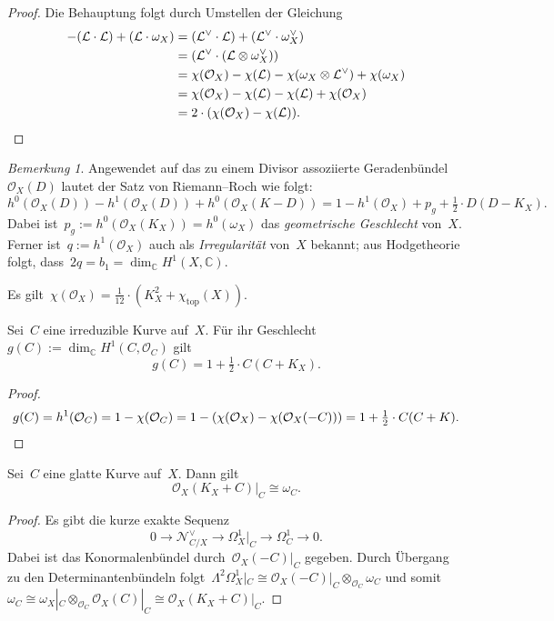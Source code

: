 \documentclass[a4paper,ngerman,12pt]{scrartcl}
\theoremstyle{definition}
\theoremstyle{plain}
\theoremstyle{remark}
\newtheorem{rem}[defn]{Bemerkung}
\newcommand{\CC}{\mathbb{C}}
\newcommand{\N}{\mathcal{N}}
\renewcommand{\L}{\mathcal{L}}
\renewcommand{\O}{\mathcal{O}}
\newcommand{\lra}{\longrightarrow}
\begin{document}
\begin{proof}Die Behauptung folgt durch Umstellen der Gleichung
\begin{align*}
  -(\L \cdot \L) + (\L \cdot \omega_X)
  &= (\L^\vee \cdot \L) + (\L^\vee \cdot \omega_X^\vee) \\
  &= (\L^\vee \cdot (\L \otimes \omega_X^\vee)) \\
  &= \chi(\O_X) - \chi(\L) - \chi(\omega_X \otimes \L^\vee) + \chi(\omega_X) \\
  &= \chi(\O_X) - \chi(\L) - \chi(\L) + \chi(\O_X) \\
  &= 2 \cdot (\chi(\O_X) - \chi(\L)). \qedhere
\end{align*}
\end{proof}

\begin{rem}Angewendet auf das zu einem Divisor assoziierte
Geradenbündel~$\O_X(D)$ lautet der Satz von Riemann--Roch wie folgt:
\[ h^0(\O_X(D)) - h^1(\O_X(D)) + h^0(\O_X(K-D)) =
  1 - h^1(\O_X) + p_g + \tfrac{1}{2} \cdot D(D-K_X). \]
Dabei ist~$p_g := h^0(\O_X(K_X)) = h^0(\omega_X)$ das \emph{geometrische
Geschlecht} von~$X$. Ferner ist~$q := h^1(\O_X)$ auch als \emph{Irregularität}
von~$X$ bekannt; aus Hodgetheorie folgt, dass~$2q = b_1 = \dim_\CC H^1(X,\CC)$.
\end{rem}

\begin{fact}
Es gilt~$\chi(\O_X) = \frac{1}{12} \cdot (K_X^2 +
\chi_\mathrm{top}(X))$.
\end{fact}

\begin{cor}
Sei~$C$ eine irreduzible Kurve auf~$X$. Für ihr Geschlecht $g(C) :=
\dim_\CC H^1(C,\O_C)$ gilt
\[ g(C) = 1 + \tfrac{1}{2} \cdot C(C+K_X). \]
\end{cor}
\begin{proof}\[ g(C) = h^1(\O_C) = 1 - \chi(\O_C) = 1 - (\chi(\O_X) -
\chi(\O_X(-C))) = 1 + \tfrac{1}{2} \cdot C(C+K). \qedhere \]
\end{proof}

\begin{prop}[Adjunktionsformel]
Sei~$C$ eine glatte Kurve auf~$X$. Dann gilt \[ \O_X(K_X+C)|_C \cong \omega_C. \]
\end{prop}
\begin{proof}Es gibt die kurze exakte Sequenz
\[ 0 \lra \N_{C/X}^\vee \lra \Omega^1_X|_C \lra \Omega^1_C \lra 0. \]
Dabei ist das Konormalenbündel durch~$\O_X(-C)|_C$ gegeben. Durch Übergang zu
den Determinantenbündeln folgt~$\Lambda^2\Omega^1_X|_C \cong
\O_X(-C)|_C \otimes_{\O_C} \omega_C$ und somit~$\omega_C \cong \omega_X|_C
\otimes_{\O_C} \O_X(C)|_C \cong \O_X(K_X+C)|_C$.
\end{proof}

\end{document}
